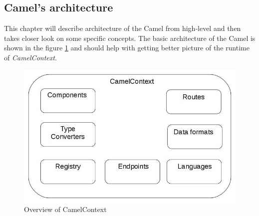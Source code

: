 \documentclass[12pt,final,oneside]{fithesis2}
\begin{document}
\subsection{Camel's architecture}
This chapter will describe architecture of the Camel from high-level and then takes closer look on some specific concepts. The basic architecture of the Camel is shown in the figure \ref{camelContext} and should help with getting better picture of the runtime of \textit{CamelContext}.

\begin{figure}[!h]
\centering
\includegraphics[width=0.9\linewidth]{sources/CamelContextCrop.jpg}
\caption{Overview of CamelContext}
\label{camelContext}
\end{figure}
\end{document}
